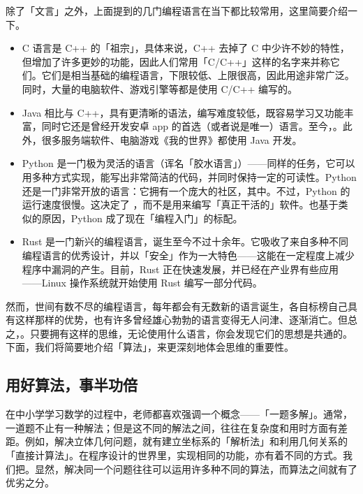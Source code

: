 除了「文言」之外，上面提到的几门编程语言在当下都比较常用，这里简要介绍一下。

\begin{itemize}
  \item C 语言是 C++ 的「祖宗」，具体来说，C++ 去掉了 C 中少许不妙的特性，但增加了许多更妙的功能，因此人们常用「C/C++」这样的名字来并称它们。它们是相当基础的编程语言，下限较低、上限很高，因此用途非常广泛。同时，大量的电脑软件、游戏引擎等都是使用 C/C++ 编写的。
  \item Java 相比与 C++，具有更清晰的语法，编写难度较低，既容易学习又功能丰富，同时它还是曾经开发安卓 app 的首选（或者说是唯一）语言。至今，。此外，很多服务端软件、电脑游戏《我的世界》都使用 Java 开发。
  \item Python 是一门极为灵活的语言（诨名「胶水语言」）——同样的任务，它可以用多种方式实现，能写出非常简洁的代码，并同时保持一定的可读性。Python 还是一门非常开放的语言：它拥有一个庞大的社区，其中。不过，Python 的运行速度很慢。这决定了 ，而不是用来编写「真正干活的」软件。也基于类似的原因，Python 成了现在「编程入门」的标配。
  \item Rust 是一门新兴的编程语言，诞生至今不过十余年。它吸收了来自多种不同编程语言的优秀设计，并以「安全」作为一大特色——这能在一定程度上减少程序中漏洞的产生。目前，Rust 正在快速发展，并已经在产业界有些应用——Linux 操作系统就开始使用 Rust 编写一部分代码。
\end{itemize}

然而，世间有数不尽的编程语言，每年都会有无数新的语言诞生，各自标榜自己具有这样那样的优势，也有许多曾经雄心勃勃的语言变得无人问津、逐渐消亡。但总之，。只要拥有这样的思维，无论使用什么语言，你会发现它们的思想是共通的。下面，我们将简要地介绍「算法」，来更深刻地体会思维的重要性。

\subsection{用好算法，事半功倍}

在中小学学习数学的过程中，老师都喜欢强调一个概念——「一题多解」。通常，一道题不止有一种解法；但是这不同的解法之间，往往在复杂度和用时方面有差距。例如，解决立体几何问题，就有建立坐标系的「解析法」和利用几何关系的「直接计算法」。在程序设计的世界里，实现相同的功能，亦有着不同的方式。我们把。显然，解决同一个问题往往可以运用许多种不同的算法，而算法之间就有了优劣之分。

